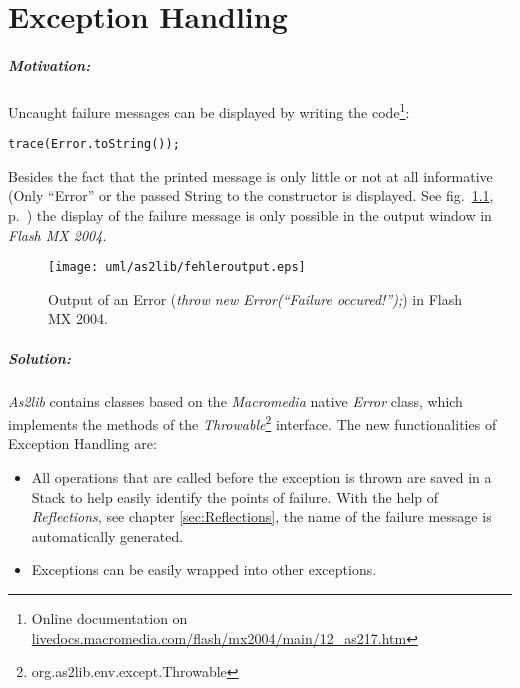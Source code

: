 \chapter{Exception Handling}
\label{sec:ExceptionHandling}

\paragraph{Motivation:}
Uncaught failure messages can be displayed by writing the code\footnote{Online documentation on \href{http://livedocs.macromedia.com/flash/mx2004/main/12_as217.htm}{livedocs.macromedia.com/flash/mx2004/main/12\_as217.htm}}:
\begin{lstlisting}[frame=single]
trace(Error.toString());
\end{lstlisting}
Besides the fact that the printed message is only little or not at all informative (Only ``Error'' or the passed String to the constructor is displayed. See fig.\ \ref{fig:fehleroutput}, p.\ \pageref{fig:fehleroutput}) the display of the failure message is only possible in the output window in {\sl Flash MX 2004}.

\begin{figure}[!ht]
\begin{center}
\texttt{[image: uml/as2lib/fehleroutput.eps]}
\caption{Output of an Error (\emph{throw new Error(``Failure occured!'');}) in Flash MX 2004.}
\label{fig:fehleroutput}
\end{center}
\end{figure}

\paragraph{Solution:}
{\sl As2lib} contains classes based on the {\sl Macromedia} native {\sl Error} class, which implements the methods of the \emph{Throwable}\footnote{org.as2lib.env.except.Throwable} interface.
The new functionalities of Exception Handling are:

\begin{itemize}
	\item All operations that are called before the exception is thrown are saved in a Stack to help easily identify the points of failure. With the help of \emph{Reflections}, see chapter \ref{sec:Reflections}, the name of the failure message is automatically generated.
	\item Exceptions can be easily wrapped into other exceptions.
\end{itemize}

